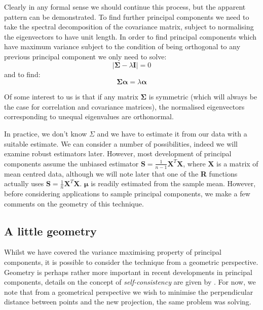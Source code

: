 Clearly in any formal sense we should continue this process, but the apparent pattern can be demonstrated.   To find further principal components we need to take the spectral decomposition of the covariance matrix, subject to normalising the eigenvectors to have unit length.   In order to find principal components which have maximum variance subject to the condition of being orthogonal to any previous principal component we only need to solve:
\begin{displaymath}
|\boldsymbol{\Sigma} - \lambda \boldsymbol{I}| = 0
\end{displaymath}
and to find:
\begin{displaymath}
\boldsymbol{\Sigma} \boldsymbol{\alpha} = \lambda \boldsymbol{\alpha}
\end{displaymath}

Of some interest to us is that if any matrix $\boldsymbol{\Sigma}$ is symmetric (which will always be the case for correlation and covariance matrices), the normalised eigenvectors corresponding to unequal eigenvalues are orthonormal.

In practice, we don't know $\Sigma$ and we have to estimate it from our data with a suitable estimate.   We can consider a number of possibilities, indeed we will examine robust estimators later.   However, most development of principal components assume the unbiased estimator $\boldsymbol{S} = \frac{1}{n-1} \boldsymbol{X}^{T}\boldsymbol{X}$, where $\boldsymbol{X}$ is a matrix of mean centred data, although we will note later that one of the \textbf{R} functions actually uses $\boldsymbol{S} = \frac{1}{n} \boldsymbol{X}^{T}\boldsymbol{X}$.   $\boldsymbol{\mu}$ is readily estimated from the sample mean.   However, before considering applications to sample principal components, we make a few comments on the geometry of this technique.

\subsection{A little geometry}

Whilst we have covered the variance maximising property of principal components, it is possible to consider the technique from a geometric perspective.   Geometry is perhaps rather more important in recent developments in principal components, details on the concept of \emph{self-consistency} are given by \cite{Flury:1997}. For now, we note that from a geometrical perspective we wish to minimise the perpendicular distance between points and the new projection, the same problem \cite{Pearson:1901} was solving.

